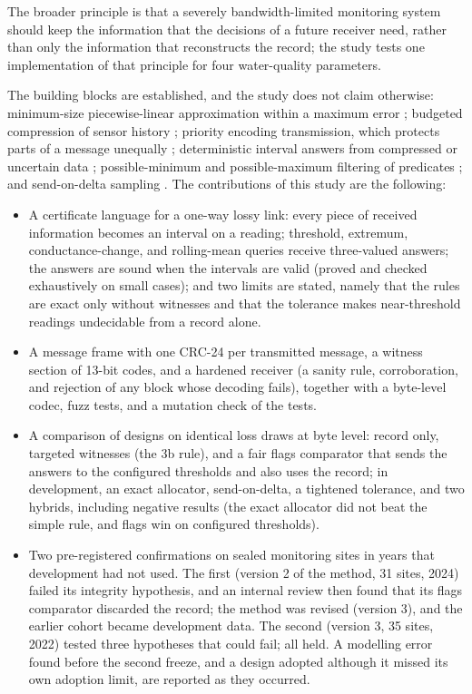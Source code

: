 The broader principle is that a severely bandwidth-limited monitoring system should keep the information that the decisions of a future receiver need, rather than only the information that reconstructs the record; the study tests one implementation of that principle for four water-quality parameters.

The building blocks are established, and the study does not claim otherwise: minimum-size piecewise-linear approximation within a maximum error \citep{imai1988,orourke1981}; budgeted compression of sensor history \citep{deligiannakis2007}; priority encoding transmission, which protects parts of a message unequally \citep{albanese1996,boucheron2000pet}; deterministic interval answers from compressed or uncertain data \citep{cheng2003probabilistic,brito2017platodb,lin2019plato}; possible-minimum and possible-maximum filtering of predicates \citep{taurone2024treat}; and send-on-delta sampling \citep{diazcacho2017sod}. The contributions of this study are the following:
\begin{itemize}
  \item A certificate language for a one-way lossy link: every piece of received information becomes an interval on a reading; threshold, extremum, conductance-change, and rolling-mean queries receive three-valued answers; the answers are sound when the intervals are valid (proved and checked exhaustively on small cases); and two limits are stated, namely that the rules are exact only without witnesses and that the tolerance makes near-threshold readings undecidable from a record alone.
  \item A message frame with one CRC-24 per transmitted message, a witness section of 13-bit codes, and a hardened receiver (a sanity rule, corroboration, and rejection of any block whose decoding fails), together with a byte-level codec, fuzz tests, and a mutation check of the tests.
  \item A comparison of designs on identical loss draws at byte level: record only, targeted witnesses (the 3b rule), and a fair flags comparator that sends the answers to the configured thresholds and also uses the record; in development, an exact allocator, send-on-delta, a tightened tolerance, and two hybrids, including negative results (the exact allocator did not beat the simple rule, and flags win on configured thresholds).
  \item Two pre-registered confirmations on sealed monitoring sites in years that development had not used. The first (version 2 of the method, 31 sites, 2024) failed its integrity hypothesis, and an internal review then found that its flags comparator discarded the record; the method was revised (version 3), and the earlier cohort became development data. The second (version 3, 35 sites, 2022) tested three hypotheses that could fail; all held. A modelling error found before the second freeze, and a design adopted although it missed its own adoption limit, are reported as they occurred.
\end{itemize}

